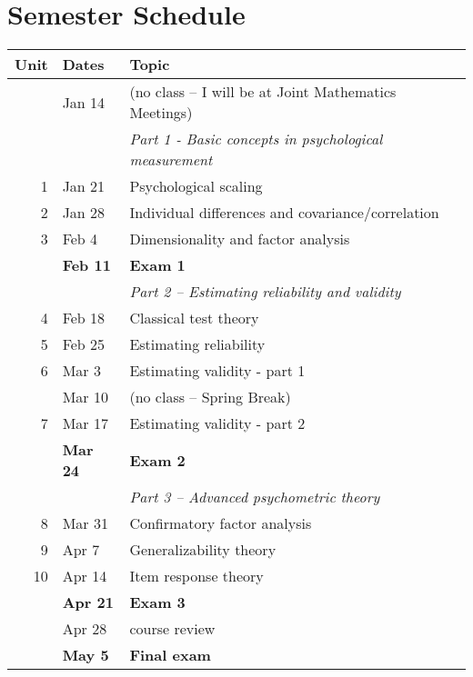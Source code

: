 \documentclass[10pt]{article}
\begin{document}
\section*{Semester Schedule}
\label{sec:org40a4e68}
\begin{center}
\begin{tabular}{rll}
Unit & Dates & Topic\\
\hline
 & Jan 14 & (no class -- I will be at Joint Mathematics Meetings)\\
 &  & \emph{Part 1 - Basic concepts in psychological measurement}\\
1 & Jan 21 & Psychological scaling\\
2 & Jan 28 & Individual differences and covariance/correlation\\
3 & Feb 4 & Dimensionality and factor analysis\\
 & \textbf{Feb 11} & \textbf{Exam 1}\\
\hline
 &  & \emph{Part 2 -- Estimating reliability and validity}\\
4 & Feb 18 & Classical test theory\\
5 & Feb 25 & Estimating reliability\\
6 & Mar 3 & Estimating validity - part 1\\
 & Mar 10 & (no class -- Spring Break)\\
7 & Mar 17 & Estimating validity - part 2\\
 & \textbf{Mar 24} & \textbf{Exam 2}\\
\hline
 &  & \emph{Part 3 -- Advanced psychometric theory}\\
8 & Mar 31 & Confirmatory factor analysis\\
9 & Apr 7 & Generalizability theory\\
10 & Apr 14 & Item response theory\\
 & \textbf{Apr 21} & \textbf{Exam 3}\\
 & Apr 28 & course review\\
 & \textbf{May 5} & \textbf{Final exam}\\
\hline
\end{tabular}
\end{center}
\end{document}
